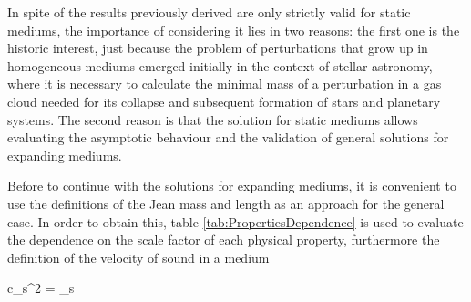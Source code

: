 In spite of the results previously derived are only strictly valid for 
static mediums, the importance of considering it lies in two reasons: the
first one is the historic interest, just because the problem of 
perturbations that grow up in homogeneous mediums emerged initially in the 
context of stellar astronomy, where it is necessary to calculate the 
minimal mass of a perturbation in a gas cloud needed for its collapse and 
subsequent formation of stars and planetary systems. The second reason is 
that the solution for static mediums allows evaluating the asymptotic 
behaviour and the validation of general solutions for expanding mediums.


Before to continue with the solutions for expanding mediums, it is 
convenient to use the definitions of the Jean mass and length as an 
approach for the general case. In order to obtain this, table 
\ref{tab:PropertiesDependence} is used to evaluate the dependence on the
scale factor of each physical property, furthermore the definition of the 
velocity of sound in a medium \cite{pathria1996}

	

{ c_s^2 = _s }


